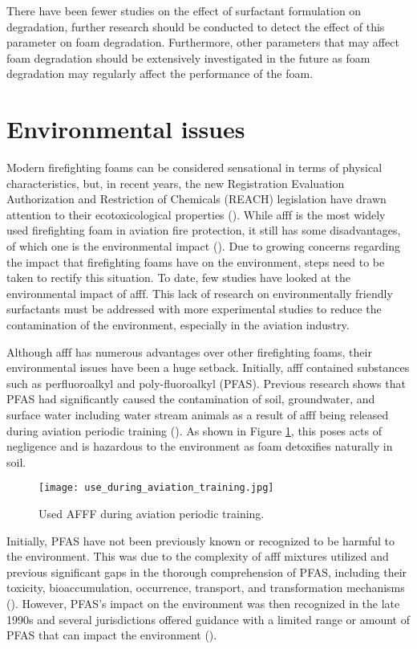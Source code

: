 There have been fewer studies on the effect of surfactant formulation on degradation, further research should be conducted to detect the effect of this parameter on foam degradation. Furthermore, other parameters that may affect foam degradation should be extensively investigated in the future as foam degradation may regularly affect the performance of the foam.

\section{Environmental issues}
Modern firefighting foams can be considered sensational in terms of physical characteristics, but, in recent years, the new Registration Evaluation Authorization and Restriction of Chemicals (REACH) legislation have drawn attention to their ecotoxicological properties (\cite{turekova2011environmental}). While \acrshort{afff} is the most widely used firefighting foam in aviation fire protection, it still has some disadvantages, of which one is the environmental impact (\cite{zhao2016improving}). Due to growing concerns regarding the impact that firefighting foams have on the environment, steps need to be taken to rectify this situation. To date, few studies have looked at the environmental impact of \acrshort{afff}. This lack of research on environmentally friendly surfactants must be addressed with more experimental studies to reduce the contamination of the environment, especially in the aviation industry. 

Although \acrshort{afff} has numerous advantages over other firefighting foams, their environmental issues have been a huge setback. Initially, \acrshort{afff} contained substances such as perfluoroalkyl and poly-fluoroalkyl (PFAS). Previous research shows that PFAS had significantly caused the contamination of soil, groundwater, and surface water including water stream animals as a result of \acrshort{afff} being released during aviation periodic training (\cite{milley2018estimating}). As shown in Figure \ref{ch2:figure:use}, this poses acts of negligence and is hazardous to the environment as foam detoxifies naturally in soil.

\begin{figure}[H]
    \centering
    \texttt{[image: use\_during\_aviation\_training.jpg]}
    \caption{Used AFFF during aviation periodic training.}
    \label{ch2:figure:use}
\end{figure}

Initially, PFAS have not been previously known or recognized to be harmful to the environment. This was due to the complexity of \acrshort{afff} mixtures utilized and previous significant gaps in the thorough comprehension of PFAS, including their toxicity, bioaccumulation, occurrence, transport, and transformation mechanisms (\cite{milley2018estimating}). However, PFAS's impact on the environment was then recognized in the late 1990s and several jurisdictions offered guidance with a limited range or amount of PFAS that can impact the environment (\cite{hinnant2017influence}). 

